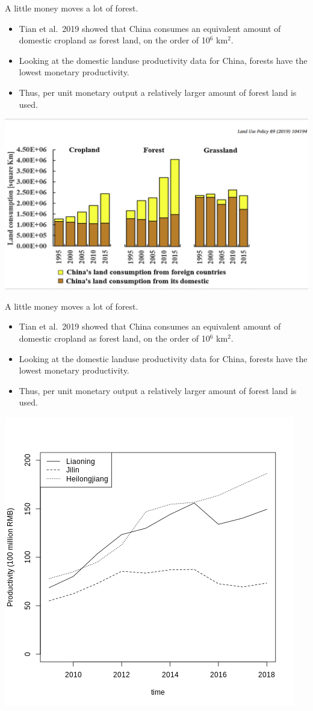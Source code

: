 \documentclass[ignorenonframetext,]{beamer}
\providecommand{\tightlist}{%
  \setlength{\itemsep}{0pt}\setlength{\parskip}{0pt}}
\begin{document}
\begin{frame}{A little money moves a lot of forest.}
\protect\hypertarget{a-little-money-moves-a-lot-of-forest.}{}

\begin{itemize}
\tightlist
\item
  Tian et al.~2019 showed that China consumes an equivalent amount of
  domestic cropland as forest land, on the order of 10\(^6\) km\(^2\).
\item
  Looking at the domestic landuse productivity data for China, forests
  have the lowest monetary productivity.
\item
  Thus, per unit monetary output a relatively larger amount of forest
  land is used.
\end{itemize}

\begin{center}\includegraphics[width=0.5\linewidth]{images/Tian_2019_Fig1} \end{center}

\end{frame}

\begin{frame}{A little money moves a lot of forest.}
\protect\hypertarget{a-little-money-moves-a-lot-of-forest.-1}{}

\begin{itemize}
\tightlist
\item
  Tian et al.~2019 showed that China consumes an equivalent amount of
  domestic cropland as forest land, on the order of 10\(^6\) km\(^2\).
\item
  Looking at the domestic landuse productivity data for China, forests
  have the lowest monetary productivity.
\item
  Thus, per unit monetary output a relatively larger amount of forest
  land is used.
\end{itemize}

\begin{center}\includegraphics[width=0.5\linewidth]{images/prod_for_time_nec} \end{center}

\end{frame}
\end{document}
